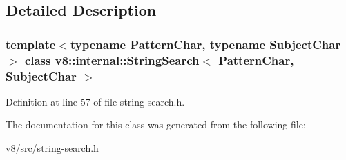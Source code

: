 \subsection{Detailed Description}
\subsubsection*{template$<$typename Pattern\+Char, typename Subject\+Char$>$\newline
class v8\+::internal\+::\+String\+Search$<$ Pattern\+Char, Subject\+Char $>$}



Definition at line 57 of file string-\/search.\+h.



The documentation for this class was generated from the following file\+:\begin{DoxyCompactItemize}
\item 
v8/src/string-\/search.\+h\end{DoxyCompactItemize}
